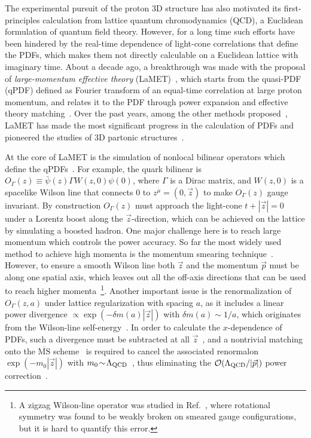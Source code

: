 \documentclass[prd,twocolumn,preprintnumbers,showpacs,nofootinbib,superscriptaddress,notitlepage,floatfix]{revtex4-1}
\newcommand{\MS}{{\overline{\mathrm{MS}}}}
\begin{document}
The experimental pursuit of the proton 3D structure has also motivated its first-principles calculation from lattice quantum chromodynamics (QCD), a Euclidean formulation of quantum field theory. However, for a long time such efforts have been hindered by the real-time dependence of light-cone correlations that define the PDFs, which makes them not directly calculable on a Euclidean lattice with imaginary time.
About a decade ago, a breakthrough was made with the proposal of \textit{large-momentum effective theory} (LaMET)~\cite{Ji:2013dva,Ji:2014gla,Ji:2020ect}, which starts from the quasi-PDF (qPDF) defined as Fourier transform of an equal-time correlation at large proton momentum, and relates it to the PDF through power expansion and effective theory matching~\cite{Ji:2020byp}. Over the past years, among the other methods proposed~\cite{Liu:1993cv,Detmold:2005gg,Braun:2007wv,Chambers:2017dov,Radyushkin:2017cyf,Ma:2017pxb}, LaMET has made the most significant progress in the calculation of PDFs and pioneered the studies of 3D partonic structures~\cite{Ji:2020ect,Constantinou:2020hdm,Boussarie:2023izj}.

At the core of LaMET is the simulation of nonlocal bilinear operators which define the qPDFs~\cite{Ji:2013dva}. For example, the quark bilinear is $O_\Gamma(z)\equiv \bar{\psi}(z)\Gamma W(z,0) \psi(0)$, where $\Gamma$ is a Dirac matrix, and $W(z,0)$ is a spacelike Wilson line that connects $0$ to $z^\mu=(0,\vec{z})$ to make $O_\Gamma(z)$ gauge invariant. 
By construction $O_\Gamma(z)$ must approach the light-cone $t+|\vec{z}|=0$ under a Lorentz boost along the $\vec{z}$-direction, which can be achieved on the lattice by simulating a boosted hadron. One major challenge here is to reach large momentum which controls the power accuracy. 
So far the most widely used method to achieve high momenta is the momentum smearing technique~\cite{Bali:2016lva}.
However, to ensure a smooth Wilson line both $\vec{z}$ and the momentum $\vec{p}$ must be along one spatial axis, which leaves out all the off-axis directions that can be used to reach higher momenta~\footnote{A zigzag Wilson-line operator was studied in Ref.~\cite{Musch:2010ka}, where rotational symmetry was found to be weakly broken on smeared gauge configurations, but it is hard to quantify this error.}.
Another important issue is the renormalization of $O_\Gamma(z,a)$ under lattice regularization with spacing $a$, as it includes a linear power divergence $\propto \exp(-\delta m(a)|\vec{z}|)$ with $\delta m(a) \!\sim \!1/a$, which originates from the Wilson-line self-energy~\cite{Dorn:1986dt,Maiani:1991az,Ji:2017oey,Ishikawa:2017faj,Green:2017xeu}. In order to calculate the $x$-dependence of PDFs, such a divergence must be subtracted at all $\vec{z}$~\cite{Ji:2020brr}, and a nontrivial matching onto the $\MS$ scheme~\cite{Holligan:2023rex,Zhang:2023bxs} is required to cancel the associated renormalon $\exp(-m_0|\vec{z}|)$ with $m_0\!\sim\! \Lambda_{\rm QCD}$~\cite{Bali:2013pla}, thus eliminating the ${\cal O}(\Lambda_{\rm QCD}/|\vec{p}|)$ power correction~\cite{Zhang:2023bxs}. 
\end{document}
